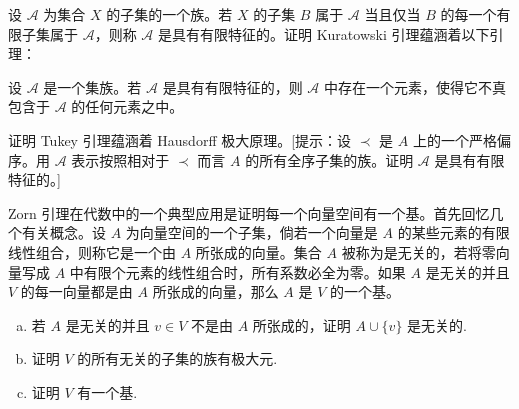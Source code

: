 \documentclass[../../main.tex]{subfiles}
\begin{document}
\begin{exercise}\label{exercise:ch01-极大原理-6}
设 $\mathcal{A}$ 为集合 $X$ 的子集的一个族。若 $X$ 的子集 $B$ 属于 $\mathcal{A}$ 当且仅当 $B$ 的每一个有限子集属于 $\mathcal{A}$，则称 $\mathcal{A}$ 是具有有限特征的。证明 Kuratowski 引理蕴涵着以下引理：

\begin{lemma}[Tukey 引理]\label{lemma:ch01-Tukey}
设 $\mathcal{A}$ 是一个集族。若 $\mathcal{A}$ 是具有有限特征的，则 $\mathcal{A}$ 中存在一个元素，使得它不真包含于 $\mathcal{A}$ 的任何元素之中。
\end{lemma}
\end{exercise}

\begin{exercise}\label{exercise:ch01-极大原理-7}
证明 Tukey 引理蕴涵着 Hausdorff 极大原理。[提示：设 $\prec$ 是 $A$ 上的一个严格偏序。用 $\mathcal{A}$ 表示按照相对于 $\prec$ 而言 $A$ 的所有全序子集的族。证明 $\mathcal{A}$ 是具有有限特征的。]
\end{exercise}

\begin{exercise}\label{exercise:ch01-极大原理-8}
Zorn 引理在代数中的一个典型应用是证明每一个向量空间有一个基。首先回忆几个有关概念。设 $A$ 为向量空间的一个子集，倘若一个向量是 $A$ 的某些元素的有限线性组合，则称它是一个由 $A$ 所张成的向量。集合 $A$ 被称为是无关的，若将零向量写成 $A$ 中有限个元素的线性组合时，所有系数必全为零。如果 $A$ 是无关的并且 $V$ 的每一向量都是由 $A$ 所张成的向量，那么 $A$ 是 $V$ 的一个基。
\begin{enumerate}[(a)]
\item 若 $A$ 是无关的并且 $v \in V$ 不是由 $A$ 所张成的，证明 $A \cup \{v\}$ 是无关的.
\item 证明 $V$ 的所有无关的子集的族有极大元.
\item 证明 $V$ 有一个基.
\end{enumerate}
\end{exercise}
\end{document}
